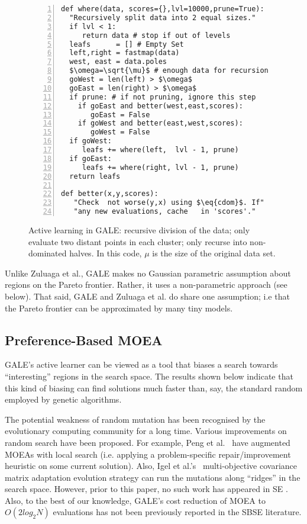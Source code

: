 \documentclass[10pt,journal,compsoc]{IEEEtran}
\newcommand{\eq}[1]{Equation~\ref{eq:#1}}
\begin{document}
\begin{figure}[!b]
\begin{minipage}{3.2in}
\hspace{0.4cm}\begin{lstlisting}[mathescape,frame=l,numbers=left]
def where(data, scores={},lvl=10000,prune=True):  
  "Recursively split data into 2 equal sizes."
  if lvl < 1: 
     return data # stop if out of levels
  leafs      = [] # Empty Set
  left,right = fastmap(data)
  west, east = data.poles
  $\omega=\sqrt{\mu}$ # enough data for recursion
  goWest = len(left) > $\omega$  
  goEast = len(right) > $\omega$ 
  if prune: # if not pruning, ignore this step
    if goEast and better(west,east,scores): 
       goEast = False 
    if goWest and better(east,west,scores): 
       goWest = False 
  if goWest:  
     leafs += where(left,  lvl - 1, prune)  
  if goEast:  
     leafs += where(right, lvl - 1, prune) 
  return leafs

def better(x,y,scores):
   "Check  not worse(y,x) using $\eq{cdom}$. If"
   "any new evaluations, cache   in 'scores'."
\end{lstlisting}

\caption{Active learning in GALE:
recursive division of the data;
only evaluate two distant points in each cluster;
only recurse into non-dominated halves.
In this code, $\mu$ is the size of the original data set.
}
\label{fig:whereCode} 
\end{minipage}
\end{figure}


 
Unlike Zuluaga et al., GALE makes no Gaussian parametric assumption about regions on the Pareto frontier.  
Rather, it uses a non-parametric approach (see below).
That said, GALE and  Zuluaga et al.  do share one  assumption; i.e that the Pareto frontier can be approximated by many tiny models. 
 

\subsection{Preference-Based MOEA}

GALE's active learner can be viewed as a tool that biases a search towards ``interesting''
regions in the search space. The results shown below indicate that this kind of biasing
can find solutions much faster than, say, the standard random employed by genetic algorithms.

The potential weakness of random
mutation has been recognised by the evolutionary computing community for a long time.
Various improvements on random search have been proposed.
For example, Peng et al.~\cite{peng09:ls} have augmented MOEAs with
local search  (i.e. applying a problem-specific repair/improvement
heuristic on some current solution).
Also, Igel et al.'s~\cite{igel07} multi-objective
covariance matrix adaptation evolution strategy
can run the mutations along  ``ridges'' in the search space.
However, prior to this paper, no such work has appeared
in   SE . Also, to the best of our knowledge, GALE's cost reduction of MOEA
to $O(2log_2N)$ evaluations  has not been previously reported in the SBSE literature.
\end{document}

